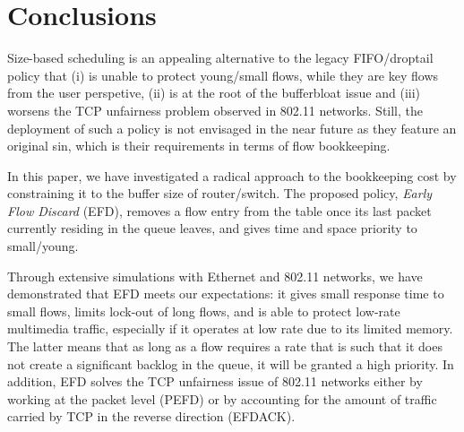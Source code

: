 \documentclass[preprint,12pt]{elsarticle}
\begin{document}
\section{Conclusions}
\label{sec:conclu}

Size-based scheduling is an appealing alternative to the legacy FIFO/drop\-tail policy that (i) is unable to protect young/small flows, while they are key flows from the user perspetive, (ii) is at the root of the bufferbloat issue and (iii) worsens the TCP unfairness problem observed in 802.11 networks.  Still, the deployment of such a policy is not envisaged in the near future as they feature an original sin, which is their requirements in terms of flow bookkeeping. 

In this paper, we have investigated a radical approach to the bookkeeping cost by constraining it to the buffer size of router/switch. The proposed policy, \textit{Early Flow Discard} (EFD), removes a flow entry from the table once its last packet currently residing in the queue leaves, and gives time and space priority to small/young.%


Through extensive simulations with Ethernet and 802.11 networks, we have demonstrated that EFD meets our expectations: it gives small response time to small flows, limits lock-out of long flows, and is able to protect low-rate multimedia traffic, especially if it operates at low rate due to its limited memory. The latter means that as long as a flow requires a rate that is such that it does not create a significant backlog in the queue, it will be granted a high priority. In addition, EFD solves the TCP unfairness issue of 802.11 networks either by working at the packet level (PEFD) or by accounting for the amount of traffic carried by TCP in the reverse direction (EFDACK).%
\end{document}
